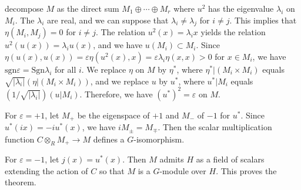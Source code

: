 decompose $M$ as the direct sum $M_1 \oplus \cdots \oplus M_r$ where $u^2$ has the eigenvalue $\lambda_i$ on $M_i$. The $\lambda_i$ are real, and we can suppose that $\lambda_i \neq \lambda_j$ for $i \neq j$. This implies that $\eta(M_i, M_j) = 0$ for $i \neq j$. The relation $u^2(x) = \lambda_i x$ yields the relation $u^2(u(x)) = \lambda_i u(x)$, and we have $u(M_i) \subset M_i$. Since $\eta(u(x), u(x)) = \varepsilon \eta(u^2(x), x) = \varepsilon \lambda_i \eta(x, x) > 0$ for $x \in M_i$, we have $\text{sgn} \varepsilon = \text{Sgn} \lambda_i$ for all $i$. We replace $\eta$ on $M$ by $\eta^*$, where $\eta^*|(M_i \times M_i)$ equals $\sqrt{|\lambda_i|}(\eta|(M_i \times M_i))$, and we replace $u$ by $u^*$, where $u^*|M_i$ equals $(1/\sqrt{|\lambda_i|})(u|M_i)$. Therefore, we have $(u^*)^2 = \varepsilon$ on $M$.

For $\varepsilon = +1$, let $M_+$ be the eigenspace of $+1$ and $M_-$ of $-1$ for $u^*$. Since $u^*(ix) = -iu^*(x)$, we have $iM_\pm = M_\mp$. Then the scalar multiplication function $C \otimes_R M_+ \rightarrow M$ defines a $G$-isomorphism.

For $\varepsilon = -1$, let $j(x) = u^*(x)$. Then $M$ admits $H$ as a field of scalars extending the action of $C$ so that $M$ is a $G$-module over $H$. This proves the theorem.

